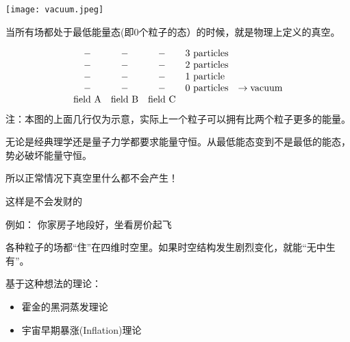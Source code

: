 \documentclass[CJK]{beamer}
\begin{document}
\begin{frame}
\bch
\begin{minipage}{0.35\textwidth}
\texttt{[image: vacuum.jpeg]}
\end{minipage}\begin{minipage}{0.55\textwidth}
当所有场都处于最低能量态(即0个粒子的态）的时候，就是物理上定义的真空。
\end{minipage}

\skipline
\begin{equation}
\begin{array}{ccclr}
- & - & - & \mathrm{3\ particles} &\\
- & - & - & \mathrm{2\ particles}&\\
- & - & - & \mathrm{1\ particle} &\\
- & - & - & \mathrm{0\ particles}& \rightarrow {\bf \rm vacuum}\\ 
{\rm field\ A} & {\rm field\ B} & {\rm field\ C}
\end{array} \nonumber
\end{equation}
{\scriptsize
注：本图的上面几行仅为示意，实际上一个粒子可以拥有比两个粒子更多的能量。
}

\ech
\end{frame}

\begin{frame}
\bch

无论是经典理学还是量子力学都要求能量守恒。从最低能态变到不是最低的能态，势必破坏能量守恒。

\skipline
所以正常情况下真空里什么都不会产生！

\ech
\end{frame}

\begin{frame}
\bch


这样是不会发财的

\ech
\end{frame}


\begin{frame}
  \bch
  
  例如： 你家房子地段好，坐看房价起飞
\ech
\end{frame}

\begin{frame}
\bch
各种粒子的场都“住”在四维时空里。如果时空结构发生剧烈变化，就能“无中生有”。

\skipline

基于这种想法的理论：
\begin{itemize}
\item{霍金的黑洞蒸发理论}
\item{宇宙早期暴涨(Inflation)理论}
\end{itemize}
\ech
\end{frame}
\end{document}
